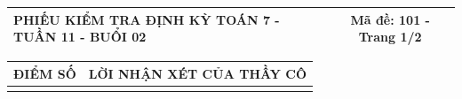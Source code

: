 \documentclass[12pt,a4paper]{article}
\begin{document}
\pagestyle{empty}
\noindent
\begin{tabularx}{\linewidth}{|X|c|}
\hline
\textbf{PHIẾU KIỂM TRA ĐỊNH KỲ TOÁN 7 - TUẦN 11 - BUỔI 02} & \textbf{Mã đề: 101 - Trang 1/2} \\
\hline
\end{tabularx}

\vspace{1.0mm}

\noindent
\begin{tabularx}{\linewidth}{|p{3.2cm}|X|}
\hline
\centering\textbf{ĐIỂM SỐ} & \centering\textbf{LỜI NHẬN XÉT CỦA THẦY CÔ} \tabularnewline
\hline
\rule{0pt}{1.8cm} & \tabularnewline
\hline
\end{tabularx}
\end{document}
